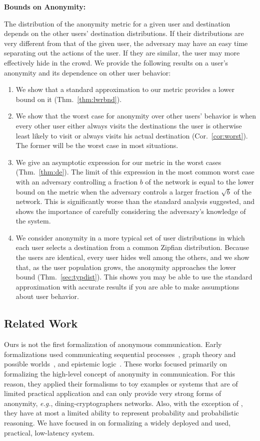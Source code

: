 \documentclass[prodmode,acmtissec]{acmsmall}
\begin{document}
{\bf Bounds on Anonymity:}

The distribution of the anonymity metric for a given user and destination depends on the other users' destination distributions.  If their distributions are very different from that of the given user, the adversary may have an easy time separating out the actions of the user.  If they are similar, the user may more effectively hide in the crowd. We provide the following results on a user's anonymity and its dependence on other user behavior:

\begin{enumerate}
\item We show that a standard approximation to our metric
provides a lower bound on it (Thm.~\ref{thm:lwrbnd}).
\item We show that the worst case for anonymity over other users' behavior is
when every other user either always visits the destinations the user
is otherwise least likely to visit or always visits his actual
destination (Cor.~\ref{cor:worst}). The former will be the worst case in most situations.
\item We give an asymptotic expression for our metric in the worst cases (Thm.~\ref{thm:de}). The limit of this expression in the 
most common worst case with an adversary controlling a fraction $b$ of the network is equal to the lower bound on the metric when the adversary controls a larger fraction $\sqrt{b}$ of the network. This is significantly worse than the standard analysis suggested, and shows the importance of carefully considering the adversary's knowledge of the system.
\item We consider anonymity in a more typical set of user distributions in which each user selects a destination from a common Zipfian distribution.  Because the users are identical, every user hides well among the others, and we show that, as the user population grows, the anonymity approaches the lower bound (Thm.~\ref{sec:typdist}). This shows you may be able to use the standard approximation with accurate results if you are able to make assumptions about user behavior.
\end{enumerate}

\subsection{Related Work}

Ours is not the first formalization of anonymous communication. Early formalizations used communicating sequential processes~\cite{schneider96}, graph theory and possible worlds~\cite{modular-approach}, and epistemic logic~\cite{GROUP,halpern-oneill-2003}.  These works focused primarily on formalizing the high-level concept of anonymity in communication. For this reason, they applied their formalisms to toy examples or systems that are of limited practical application and can only provide very strong forms of anonymity, \emph{e.g.}, dining-cryptographers networks.  Also, with the exception of , they have at most a limited ability to represent probability and probabilistic reasoning. We have focused in  on formalizing a widely deployed and used, practical, low-latency system.
\end{document}
